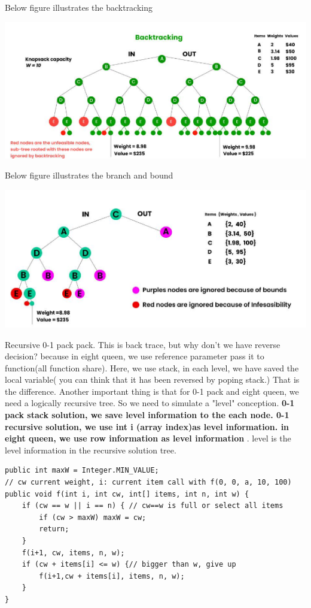\documentclass[a4paper,11pt,twoside]{book}
\begin{document}
\par Below figure illustrates the backtracking
\begin{center}
	\includegraphics[scale=0.85]{pics/ks_bt.png}
\end{center}

\par Below figure illustrates the branch and bound
\begin{center}
	\includegraphics[scale=0.85]{pics/ks_bb.png}
\end{center}


\par Recursive 0-1 pack pack. This is back trace, but why don't we have reverse decision? because in eight queen, we use reference parameter pass it to function(all function share). Here, we use stack, in each level, we have saved the local variable( you can think that it has been reversed by poping stack.)  That is the difference.  Another important thing is that for 0-1 pack and eight queen,  we need a logically recursive tree. So we need to simulate a "level" conception.  \textbf{0-1 pack stack solution, we save level information to the each node. 0-1 recursive solution, we use int i (array index)as level information. in eight queen, we use row information as level information }. level is the level information in the recursive solution tree.  
\begin{lstlisting}
public int maxW = Integer.MIN_VALUE; 
// cw current weight, i: current item call with f(0, 0, a, 10, 100)
public void f(int i, int cw, int[] items, int n, int w) {
	if (cw == w || i == n) { // cw==w is full or select all items
		if (cw > maxW) maxW = cw;
		return;
	}
	f(i+1, cw, items, n, w);
	if (cw + items[i] <= w) {// bigger than w, give up
		f(i+1,cw + items[i], items, n, w);
	}
}
\end{lstlisting}
\end{document}
